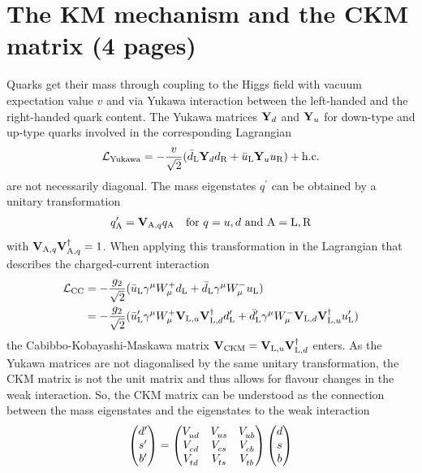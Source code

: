 
\section{The KM mechanism and the CKM matrix (4 pages)}
\label{sec:cpviolation:kmmechanism}

Quarks get their mass through coupling to the Higgs field with vacuum
expectation value $v$ and via Yukawa interaction between the left-handed and
the right-handed quark content. The Yukawa matrices $\mathbf{Y}_d$ and
$\mathbf{Y}_u$ for down-type and up-type quarks involved in the corresponding
Lagrangian
\begin{align}
	\mathcal{L}_{\textrm{Yukawa}} = - \frac{v}{\sqrt{2}} (\bar{d}_{\mathrm{L}} \mathbf{Y}_d d_{\mathrm{R}} + \bar{u}_{\mathrm{L}} \mathbf{Y}_u u_{\mathrm{R}}) + \text{h.c.}
\end{align}
are not necessarily diagonal. The mass eigenstates $q^{\prime}$ can be
obtained by a unitary transformation
\begin{align}
	q^{\prime}_{\mathrm{A}} = \mathbf{V}_{\mathrm{A,}q}q_{\mathrm{A}} \quad \text{for } q = u,d \text{ and } \mathrm{A} = \mathrm{L,R}
\end{align}
with $\mathbf{V}_{\mathrm{A,}q}\mathbf{V}^\dagger_{\mathrm{A,}q} = 1$. When
applying this transformation in the Lagrangian that describes the
charged-current interaction
\begin{align}
	\mathcal{L}_{\textrm{CC}} &= -\frac{g_2}{\sqrt{2}}(\bar{u}_{\mathrm{L}}\gamma^{\mu}W_{\mu}^+ d_{\mathrm{L}} + \bar{d}_{\mathrm{L}}\gamma^{\mu}W_{\mu}^-u_{\mathrm{L}})\\
	&= -\frac{g_2}{\sqrt{2}}(\bar{u}^\prime_{\mathrm{L}}\gamma^{\mu}W_{\mu}^+\mathbf{V}_{\mathrm{L,}u}\mathbf{V}^\dagger_{\mathrm{L,}d}d^\prime_{\mathrm{L}} + \bar{d}^\prime_{\mathrm{L}}\gamma^{\mu}W_{\mu}^-\mathbf{V}_{\mathrm{L,}d}\mathbf{V}^\dagger_{\mathrm{L,}u}u^\prime_{\mathrm{L}})
\end{align}
the Cabibbo-Kobayashi-Maskawa matrix $\mathbf{V}_{\text{CKM}} =
\mathbf{V}_{\mathrm{L,}u}\mathbf{V}^\dagger_{\mathrm{L,}d}$ enters. As the
Yukawa matrices are not diagonalised by the same unitary transformation, the
CKM matrix is not the unit matrix and thus allows for flavour changes in the
weak interaction. So, the CKM matrix can be understood as the connection
between the mass eigenstates and the eigenstates to the weak interaction
\begin{align}
\begin{pmatrix}
d^\prime \\ s^\prime \\ b^\prime
\end{pmatrix}
=
\begin{pmatrix}
{\ensuremath{V_{{u}{d}}^{}}} & {V_{{u}{s}}^{}} & {V_{{u}{b}}^{}} \\
{V_{{c}{d}}^{}} & {V_{{c}{s}}^{}} & {V_{{c}{b}}^{}} \\
{V_{{t}{d}}^{}} & {V_{{t}{s}}^{}} & {V_{{t}{b}}^{}} \\
\end{pmatrix}
\begin{pmatrix}
d	\\	s	\\	b
\end{pmatrix}
\end{align}
